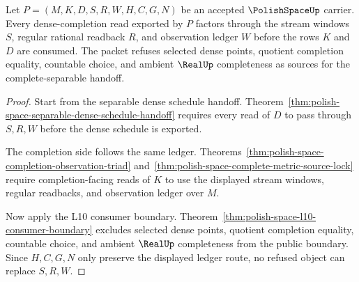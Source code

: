 \begin{theorem}
\label{thm:polish-space-dense-completion-ledger-refusal}
Let $P=(M,K,D,S,R,W,H,C,G,N)$ be an accepted $\PolishSpaceUp$ carrier. Every dense-completion read exported by $P$ factors through the stream windows $S$, regular rational readback $R$, and observation ledger $W$ before the rows $K$ and $D$ are consumed. The packet refuses selected dense points, quotient completion equality, countable choice, and ambient $\RealUp$ completeness as sources for the complete-separable handoff.
\end{theorem}
\begin{proof}
Start from the separable dense schedule handoff. Theorem~\ref{thm:polish-space-separable-dense-schedule-handoff} requires every read of $D$ to pass through $S,R,W$ before the dense schedule is exported.

The completion side follows the same ledger. Theorems~\ref{thm:polish-space-completion-observation-triad} and~\ref{thm:polish-space-complete-metric-source-lock} require completion-facing reads of $K$ to use the displayed stream windows, regular readbacks, and observation ledger over $M$.

Now apply the L10 consumer boundary. Theorem~\ref{thm:polish-space-l10-consumer-boundary} excludes selected dense points, quotient completion equality, countable choice, and ambient $\RealUp$ completeness from the public boundary. Since $H,C,G,N$ only preserve the displayed ledger route, no refused object can replace $S,R,W$.
\end{proof}

